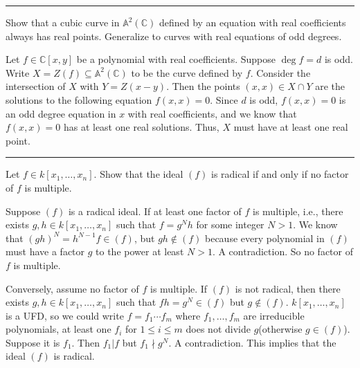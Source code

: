 \documentclass[letterpaper, 12pt]{article}
\begin{document}
\noindent\rule{7in}{2.8pt}
\begin{problem}{1.2}
Show that a cubic curve in \(\mathbb{A}^2(\mathbb{C})\) defined by an equation with real coefficients always has real points. Generalize to curves with real equations of odd degrees.
\end{problem}
\begin{solution}
Let \(f\in \mathbb{C}[x,y]\) be a polynomial with real coefficients. Suppose \(\deg f=d\) is odd. Write \(X=Z(f)\subseteq \mathbb{A}^2(\mathbb{C})\) to be the curve defined by \(f\). Consider the intersection of \(X\) with \(Y=Z(x-y)\). Then the points \((x,x)\in X\cap Y\) are the solutions to the following equation \(f(x,x)=0\). Since \(d\) is odd, \(f(x,x)=0\) is an odd degree equation in \(x\) with real coefficients, and we know that \(f(x,x)=0\) has at least one real solutions. Thus, \(X\) must have at least one real point.
\end{solution}

\noindent\rule{7in}{2.8pt}
\begin{problem}{1.3}
Let \(f\in k[x_1,\ldots,x_n]\). Show that the ideal \((f)\) is radical if and only if no factor of \(f\) is multiple. 
\end{problem}
\begin{solution}
Suppose \((f)\) is a radical ideal. If at least one factor of \(f\) is multiple, i.e., there exists \(g,h\in k[x_1,\ldots,x_n]\) such that \(f=g^N h\) for some integer \(N>1\). We know that \((gh)^N=h^{N-1}f\in (f)\), but \(gh\notin (f)\) because every polynomial in \((f)\) must have a factor \(g\) to the power at least \(N>1\). A contradiction. So no factor of \(f\) is multiple. 

Conversely, assume no factor of \(f\) is multiple. If \((f)\) is not radical, then there exists \(g,h\in k[x_1,\ldots,x_n]\) such that \(fh=g^N\in (f)\) but \(g\notin (f)\). \(k[x_1,\ldots,x_n]\) is a UFD, so we could write \(f=f_1\cdots f_m\) where \(f_1,\ldots,f_m\) are irreducible polynomials, at least one \(f_i\) for \(1\leq i\leq m\) does not divide \(g\)(otherwise \(g\in (f)\)). Suppose it is \(f_1\). Then \(f_1|f\) but \(f_1\nmid g^N\). A contradiction. This implies that the ideal \((f)\) is radical.
\end{solution}
\end{document}
